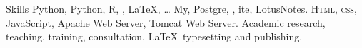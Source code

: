 
\begin{rubric}{Skills}
	Python, Python, R, , \LaTeX, \ldots
	\entry*[Databases]
	My, Postgre, , ite, LotusNotes.
	\textsc{Html, css}, JavaScript, Apache Web Server, Tomcat Web Server.
	\entry*[Misc.]
	Academic research, teaching, training, consultation, \LaTeX\ typesetting and publishing.
\end{rubric}


